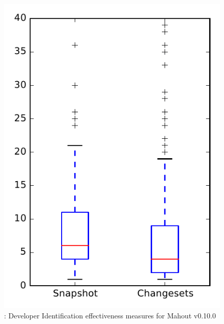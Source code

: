 
\begin{figure}
\centering
\includegraphics[height=0.4\textheight]{figures/dit/rq1_mahout}
\caption{\done: Developer Identification effectiveness measures for Mahout v0.10.0}
\label{fig:dit:rq1:mahout}
\end{figure}
